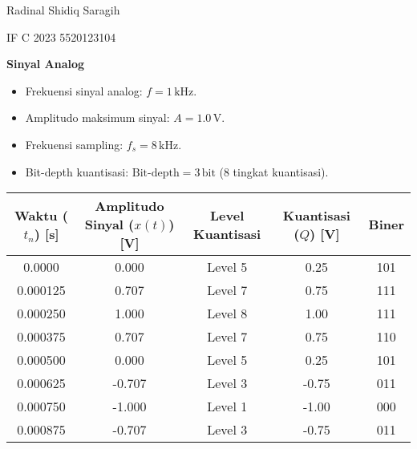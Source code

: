 \documentclass[12pt,a4paper]{article}
\date{}
\begin{document}
Radinal Shidiq Saragih

IF C 2023 5520123104

\vspace{1cm}

\textbf{Sinyal Analog}
\begin{itemize}
    \item Frekuensi sinyal analog: $f = 1 \, \text{kHz}$.
    \item Amplitudo maksimum sinyal: $A = 1.0 \, \text{V}$.
    \item Frekuensi sampling: $f_s = 8 \, \text{kHz}$.
    \item Bit-depth kuantisasi: $\text{Bit-depth} = 3 \, \text{bit}$ (8 tingkat kuantisasi).
\end{itemize}
    
\begin{table}[h!]
\centering
\begin{tabular}{|c|c|c|c|c|}
\hline
\textbf{Waktu ($t_n$) [s]} & \textbf{Amplitudo Sinyal ($x(t)$) [V]} & \textbf{Level Kuantisasi} & \textbf{Kuantisasi ($Q$) [V]} & \textbf{Biner} \\ \hline
0.0000                     & 0.000                                 & Level 5                  & 0.25                          & 101            \\ \hline
0.000125                   & 0.707                                 & Level 7                  & 0.75                          & 111            \\ \hline
0.000250                   & 1.000                                 & Level 8                  & 1.00                          & 111            \\ \hline
0.000375                   & 0.707                                 & Level 7                  & 0.75                          & 110            \\ \hline
0.000500                   & 0.000                                 & Level 5                  & 0.25                          & 101            \\ \hline
0.000625                   & -0.707                                & Level 3                  & -0.75                         & 011            \\ \hline
0.000750                   & -1.000                                & Level 1                  & -1.00                         & 000            \\ \hline
0.000875                   & -0.707                                & Level 3                  & -0.75                         & 011            \\ \hline
\end{tabular}
\end{table}
\end{document}
